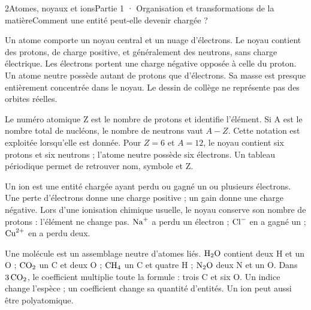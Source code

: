 \begin{ouverture}[college1]{2}{Atomes, noyaux et ions}{Partie 1 · Organisation et transformations de la matière}{Comment une entité peut-elle devenir chargée ?}
\end{ouverture}
\label{ess-2}
Un atome comporte un noyau central et un nuage d’électrons. Le noyau contient des protons, de charge positive, et généralement des neutrons, sans charge électrique. Les électrons portent une charge négative opposée à celle du proton. Un atome neutre possède autant de protons que d’électrons. Sa masse est presque entièrement concentrée dans le noyau. Le dessin de collège ne représente pas des orbites réelles.\par
{}
Le numéro atomique Z est le nombre de protons et identifie l’élément. Si A est le nombre total de nucléons, le nombre de neutrons vaut $A-Z$. Cette notation est exploitée lorsqu’elle est donnée. Pour $Z=6$ et $A=12$, le noyau contient six protons et six neutrons ; l’atome neutre possède six électrons. Un tableau périodique permet de retrouver nom, symbole et Z.\par
\clearpage
{}
Un ion est une entité chargée ayant perdu ou gagné un ou plusieurs électrons. Une perte d’électrons donne une charge positive ; un gain donne une charge négative. Lors d’une ionisation chimique usuelle, le noyau conserve son nombre de protons : l’élément ne change pas. $\ce{Na+}$ a perdu un électron ; $\ce{Cl-}$ en a gagné un ; $\ce{Cu^{2+}}$ en a perdu deux.\par
{}
Une molécule est un assemblage neutre d’atomes liés. $\ce{H2O}$ contient deux H et un O ; $\ce{CO2}$ un C et deux O ; $\ce{CH4}$ un C et quatre H ; $\ce{N2O}$ deux N et un O. Dans $3\,\ce{CO2}$, le coefficient multiplie toute la formule : trois C et six O. Un indice change l’espèce ; un coefficient change sa quantité d’entités. Un ion peut aussi être polyatomique.\par
